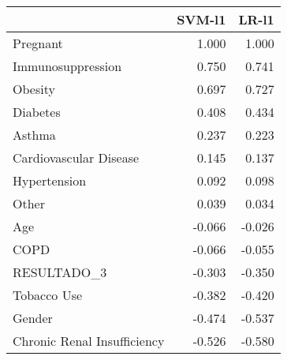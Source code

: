 \begin{tabular}{lrr}
\toprule
{} &  SVM-l1 &  LR-l1 \\
\midrule
Pregnant                    &   1.000 &  1.000 \\
Immunosuppression           &   0.750 &  0.741 \\
Obesity                     &   0.697 &  0.727 \\
Diabetes                    &   0.408 &  0.434 \\
Asthma                      &   0.237 &  0.223 \\
Cardiovascular Disease      &   0.145 &  0.137 \\
Hypertension                &   0.092 &  0.098 \\
Other                       &   0.039 &  0.034 \\
Age                         &  -0.066 & -0.026 \\
COPD                        &  -0.066 & -0.055 \\
RESULTADO\_3                 &  -0.303 & -0.350 \\
Tobacco Use                 &  -0.382 & -0.420 \\
Gender                      &  -0.474 & -0.537 \\
Chronic Renal Insufficiency &  -0.526 & -0.580 \\
\bottomrule
\end{tabular}
